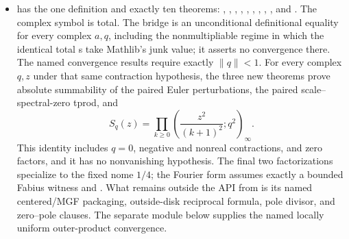 \documentclass[11pt,a4paper,oneside,openany]{book}
\theoremstyle{definition}
\theoremstyle{remark}
\begin{document}
\begin{itemize}
\item {} has the one definition
 and exactly ten theorems:
,
,
,
,
,
,
,
,
, and
.  The complex
symbol is total.  The bridge
 is an unconditional
definitional equality for every complex \(a,q\), including the
nonmultipliable regime in which the identical total s take
Mathlib's junk value; it asserts no convergence there.  The named convergence
results require exactly
\(\lVert q\rVert<1\).  For every complex \(q,z\) under that same contraction
hypothesis, the three new theorems prove absolute summability of the paired
Euler perturbations, the paired scale--spectral-zero tprod, and
\[
 S_q(z)=\prod_{k\ge0}
 \left(\frac{z^2}{(k+1)^2};q^2\right)_\infty .
\]
This identity includes \(q=0\), negative and nonreal contractions, and zero
factors, and it has no nonvanishing hypothesis.  The final two factorizations
specialize to the fixed nome
\(1/4\); the Fourier form assumes exactly a bounded Fabius witness and
.  What remains outside the API from
 is its named centered/MGF packaging, outside-disk
reciprocal formula, pole divisor, and zero--pole clauses.  The separate
 module below supplies the
named locally uniform outer-product convergence.


\end{itemize}
\end{document}
